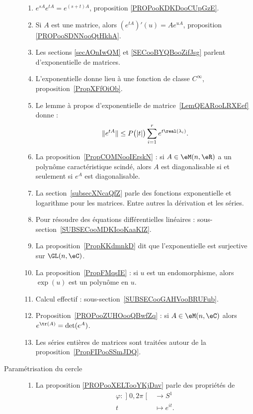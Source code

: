 \begin{description}
		\begin{enumerate}
			\item
			      \( e^{sA} e^{tA}= e^{(s+t)A}\), proposition \ref{PROPooKDKDooCUpGzE}.
			\item
			      Si \( A\) est une matrice, alors \( (e^{tA})'(u)=Ae^{uA}\), proposition \ref{PROPooSDNNooQtHkhA}.
			\item
			      Les sections \ref{secAOnIwQM} et \ref{SECooBYQBooZifJsg} parlent d'exponentielle de matrices.
			\item
			      L'exponentielle donne lieu à une fonction de classe \(  C^{\infty}\), proposition~\ref{PropXFfOiOb}.
			\item
			      Le lemme à propos d'exponentielle de matrice~\ref{LemQEARooLRXEef} donne :
			      \begin{equation*}
				      \|  e^{tA} \|\leq P\big( | t | \big)\sum_{i=1}^r e^{t\real(\lambda_i)}.
			      \end{equation*}
			\item
			      La proposition~\ref{PropCOMNooIErskN} : si \( A\in \eM(n,\eR)\) a un polynôme caractéristique scindé, alors \( A\) est diagonalisable si et seulement si \( e^A\) est diagonalisable.
			\item
			      La section~\ref{subsecXNcaQfZ} parle des fonctions exponentielle et logarithme pour les matrices. Entre autres la dérivation et les séries.
			\item
			      Pour résoudre des équations différentielles linéaires : sous-section~\ref{SUBSECooMDKIooKaaKlZ}.
			\item
			      La proposition~\ref{PropKKdmnkD} dit que l'exponentielle est surjective sur \( \GL(n,\eC)\).
			\item

			      La proposition~\ref{PropFMqsIE} : si \( u\) est un endomorphisme, alors \( \exp(u)\) est un polynôme en \( u\).
			\item
			      Calcul effectif : sous-section~\ref{SUBSECooGAHVooBRUFub}.
			\item Proposition~\ref{PROPooZUHOooQBwfZq} : si \( A\in\eM(n,\eC)\) alors \( e^{\tr(A)}=\det( e^{A})\).
			\item
			      Les séries entières de matrices sont traitées autour de la proposition~\ref{PropFIPooSSmJDQ}.
		\end{enumerate}

	\item[Paramétrisation du cercle]
		\begin{enumerate}
			\item
			      La proposition \ref{PROPooXELTooYKjDav} parle des propriétés de
			      \begin{equation}
				      \begin{aligned}
					      \varphi\colon \mathopen] 0,2\pi\mathclose[ & \to S^1         \\
					      t                                          & \mapsto e^{it}.
				      \end{aligned}
			      \end{equation}
		\end{enumerate}

\end{description}
